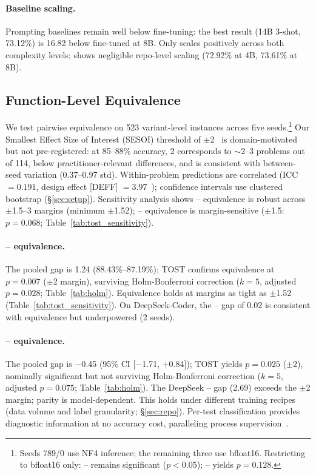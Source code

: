 \paragraph{Baseline scaling.} Prompting baselines remain well below fine-tuning: the best result (14B 3-shot, 73.12\%) is 16.82\pp{} below fine-tuned \cls{} at 8B. Only \cls{} scales positively across both complexity levels; \traj{} shows negligible repo-level scaling (72.92\% at 4B, 73.61\% at 8B).


\subsection{Function-Level Equivalence}
\label{sec:equivalence}

We test pairwise equivalence on 523 variant-level instances across five seeds.\footnote{Seeds 789/0 use NF4 inference; the remaining three use bfloat16. Restricting to bfloat16 only: \cls{}--\cwm{} remains significant ($p{<}0.05$); \cls{}--\traj{} yields $p{=}0.128$.} Our Smallest Effect Size of Interest (SESOI) threshold of $\pm$2\pp{}~\cite{lakens2017,wellek2010} is domain-motivated but not pre-registered: at 85--88\% accuracy, 2\pp{} corresponds to ${\sim}$2--3 problems out of 114, below practitioner-relevant differences, and is consistent with between-seed variation (0.37--0.97\pp{} std). Within-problem predictions are correlated (ICC $= 0.191$, design effect [DEFF] $= 3.97$~\cite{moulton1990}); confidence intervals use clustered bootstrap (\S\ref{sec:setup}). Sensitivity analysis shows \cls{}--\cwm{} equivalence is robust across $\pm$1.5--3\pp{} margins (minimum $\pm$1.52\pp{}); \cls{}--\traj{} equivalence is margin-sensitive ($\pm$1.5\pp{}: $p{=}0.068$; Table~\ref{tab:tost_sensitivity}).

\paragraph{\cls{}--\cwm{} equivalence.} The pooled gap is 1.24\pp{} (88.43\%--87.19\%); TOST confirms equivalence at $p = 0.007$ ($\pm$2\pp{} margin), surviving Holm-Bonferroni correction ($k{=}5$, adjusted $p{=}0.028$; Table~\ref{tab:holm}). Equivalence holds at margins as tight as $\pm$1.52\pp{} (Table~\ref{tab:tost_sensitivity}). On DeepSeek-Coder, the \cls{}--\cwm{} gap of 0.02\pp{} is consistent with equivalence but underpowered (2 seeds).

\paragraph{\cls{}--\traj{} equivalence.} The pooled gap is $-$0.45\pp{} (95\% CI [$-$1.71, +0.84]); TOST yields $p = 0.025$ ($\pm$2\pp{}), nominally significant but not surviving Holm-Bonferroni correction ($k{=}5$, adjusted $p{=}0.075$; Table~\ref{tab:holm}). The DeepSeek \cls{}--\traj{} gap (2.69\pp{}) exceeds the $\pm$2\pp{} margin; \traj{} parity is model-dependent. This holds under different training recipes (data volume and label granularity; \S\ref{sec:repo}). Per-test classification provides diagnostic information at no accuracy cost, paralleling process supervision~\cite{lightman2023letsverify}.


